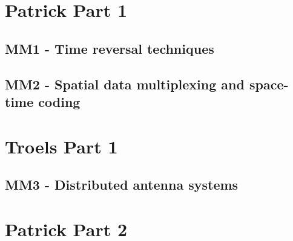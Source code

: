 



    \singlespacing
    \pagestyle{empty}	
	
	\cleardoublepage
	
	\pagestyle{plain}
		
	\tableofcontents 
	\onehalfspacing
	\pagestyle{fancy} %
    \setcounter{page}{0} %

\part{Patrick Part 1}

\chapter{MM1 - Time reversal techniques}







\chapter{MM2 - Spatial data multiplexing and space-time coding}






\part{Troels Part 1}

\chapter{MM3 - Distributed antenna systems}







\part{Patrick Part 2}

